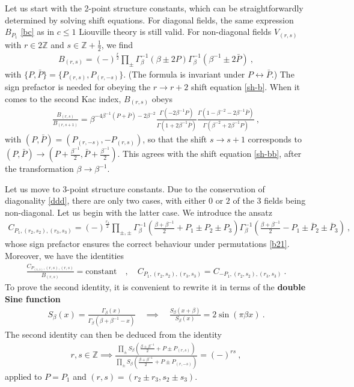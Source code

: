 \documentclass[12pt, a4paper]{article}
\theoremstyle{break}
\begin{document}
Let us start with the 2-point structure constants, which can be straightforwardly determined by solving shift equations. For diagonal fields, the same expression $B_{P_1}$ \eqref{bc} as in $c\leq 1$ Liouville theory is still valid. For non-diagonal fields $V_{(r,s)}$ with $r\in 2\mathbb{Z}$ and $s\in\mathbb{Z}+\frac12$, we find 
\begin{align}
 \boxed{B_{(r,s)} = (-)^\frac{r}{2} \prod_\pm \Gamma_\beta^{-1}\left(\beta\pm 2P\right)\Gamma_\beta^{-1}\left(\beta^{-1}\pm 2\bar P\right)}\ ,
 \label{nbrs}
\end{align}
with $\{P,\bar P\}=\{P_{(r,s)},P_{(r,-s)}\}$. (The formula is invariant under $P\leftrightarrow \bar P$.)
The sign prefactor is needed for obeying the $r\to r+2$ shift equation \eqref{sh-b}. When it comes to the second Kac index, $B_{(r,s)}$ obeys
\begin{align}
 \frac{B_{(r,s)}}{B_{(r,s+1)}} = \beta^{-4\beta^{-1}(P+\bar P)-2\beta^{-2}} \frac{\Gamma(-2\beta^{-1}P)}{\Gamma(1+2\beta^{-1}\bar P)} \frac{\Gamma(1-\beta^{-2}-2\beta^{-1}\bar P)}{\Gamma(\beta^{-2}+2\beta^{-1} P)} \ ,
\end{align}
with $(P, \bar P)=(P_{(r,-s)},-P_{(r,s)})$, so that the shift $s\to s+1$ corresponds to $(P,\bar P)\to (P+\frac{\beta^{-1}}{2},\bar P+\frac{\beta^{-1}}{2})$. This agrees with the shift equation \eqref{sh-bb}, after the transformation $\beta \to \beta^{-1}$. 

Let us move to 3-point structure constants. Due to the conservation of diagonality \eqref{ddd}, there are only two cases, with either $0$ or $2$ of the $3$ fields being non-diagonal. Let us begin with the latter case. We introduce the ansatz 
\begin{align}
 \boxed{C_{P_1,(r_2,s_2),(r_3,s_3)} = (-)^{\frac{r_3}{2}}\prod_{\pm,\pm}
 \Gamma_\beta^{-1}\left(\tfrac{\beta+\beta^{-1}}{2}+P_1 \pm P_2\pm P_3\right) 
 \Gamma_\beta^{-1}\left(\tfrac{\beta+\beta^{-1}}{2}-P_1 \pm \bar P_2\pm \bar P_3\right)}\ ,
 \label{cdnn}
\end{align}
whose sign prefactor ensures the correct behaviour under permutations \eqref{b21}. Moreover, we have the identities
\begin{align}
 \frac{C_{P_{(1,1)},(r,s),(r,s)}}{B_{(r,s)}} = \text{constant} \quad ,\quad 
 C_{P_1,(r_2,s_2),(r_3,s_3)}=C_{-P_1,(r_2,s_2),(r_3,s_3)} \ .
 \label{cpcmp}
\end{align}
To prove the second identity, it is convenient to rewrite it in terms of the \textbf{double Sine function}
\begin{align}
 S_\beta(x) = \frac{\Gamma_\beta(x)}{\Gamma_\beta(\beta + \beta^{-1}-x)}\quad \implies \quad \frac{S_\beta(x+\beta)}{S_\beta(x)} = 2\sin(\pi\beta x)\ .
 \label{sb}
\end{align}
The second identity can then be deduced from the identity 
\begin{align}
 r,s\in\mathbb{Z} \implies \frac{\prod_\pm S_\beta\left(\frac{\beta+\beta^{-1}}{2} +P \pm P_{(r,s)}\right)}{\prod_\pm S_\beta\left(\frac{\beta+\beta^{-1}}{2} +P \pm P_{(r,-s)}\right)} =(-)^{rs}\ ,
 \label{dsr}
\end{align}
applied to $P=P_1$ and $(r,s)=(r_2\pm r_3,s_2\pm s_3)$.
\end{document}
